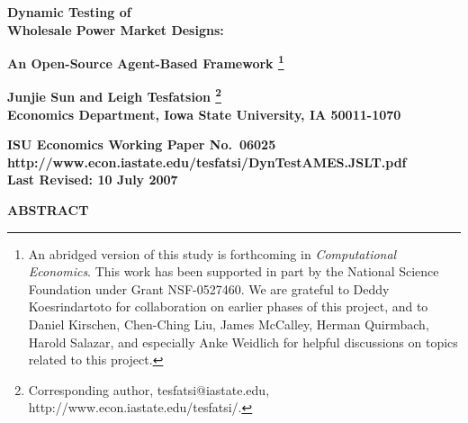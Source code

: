 \documentclass[12pt]{article}
\begin{document}
\begin{center}

      \vspace*{6mm}

              {\bf\large         Dynamic Testing of\\
                            Wholesale Power Market Designs:}

\bigskip
                 {\bf\large An Open-Source Agent-Based Framework%
\footnote{An abridged version of this study is forthcoming in \textit{Computational Economics\/}. This work has been supported in part by the National Science Foundation under Grant NSF-0527460.  We are grateful to Deddy Koesrindartoto for collaboration on earlier phases of this project, and to Daniel Kirschen, Chen-Ching Liu, James McCalley, Herman Quirmbach, Harold Salazar, and especially Anke Weidlich for helpful discussions on topics related to this project.}}

\vspace*{8mm}

        {\bf Junjie Sun and Leigh Tesfatsion%
\footnote{Corresponding author, tesfatsi@iastate.edu, http://www.econ.iastate.edu/tesfatsi/.}}\\
         {\bf Economics Department, Iowa State University, IA 50011-1070}\\
    
\medskip

   
\vspace*{3mm}     
                        {\bf ISU Economics Working Paper No.~06025}\\
                       {\bf http://www.econ.iastate.edu/tesfatsi/DynTestAMES.JSLT.pdf}\\
                           {\bf Last Revised: 10 July 2007}

\end{center}


\pagestyle{plain}

\setcounter{page}{1}

\begin{center}  \textbf{ABSTRACT}  \end{center}

\smallskip
\end{document}
